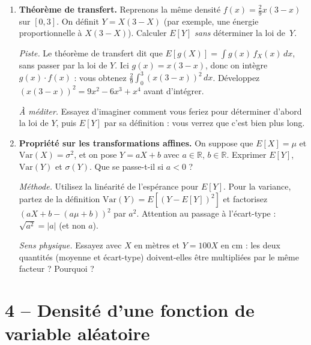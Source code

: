 \begin{enumerate}
\begin{solution}
    \textit{Comparaison.} Calculez la variance de la loi constante
    sur $[0,3]$ à l'aide de la formule de la question précédente,
    puis comparez les deux : laquelle des deux densités vous paraît
    la plus \og étalée \fg{} (revoir l'allure de $f$) ? Le résultat
    est-il cohérent ?
  \end{solution}

  \item \textbf{Théorème de transfert.}
  Reprenons la même densité $f(x)=\tfrac{2}{9}x(3-x)$ sur $[0,3]$.
  On définit $Y=X(3-X)$ (par exemple, une énergie proportionnelle
  à $X(3-X)$).
  Calculer $E[Y]$ \emph{sans} déterminer la loi de~$Y$.
  \begin{solution}
    \textit{Piste.} Le théorème de transfert dit que
    $E[g(X)]=\int g(x)\,f_X(x)\,dx$, sans passer par la loi de $Y$.
    Ici $g(x)=x(3-x)$, donc on intègre $g(x)\cdot f(x)$ :
    vous obtenez $\tfrac{2}{9}\int_0^3 (x(3-x))^2\,dx$.
    Développez $(x(3-x))^2=9x^2-6x^3+x^4$ avant d'intégrer.

    \textit{À méditer.} Essayez d'imaginer comment vous feriez
    pour déterminer d'abord la loi de $Y$, puis $E[Y]$ par
    sa définition : vous verrez que c'est bien plus long.
  \end{solution}

  \item \textbf{Propriété sur les transformations affines.}
  On suppose que $E[X]=\mu$ et $\text{Var}(X)=\sigma^2$,
  et on pose $Y=aX+b$ avec $a\in\mathbb R$, $b\in\mathbb R$.
  Exprimer $E[Y]$, $\text{Var}(Y)$ et $\sigma(Y)$.
  Que se passe-t-il si $a<0$ ?
  \begin{solution}
    \textit{Méthode.} Utilisez la linéarité de l'espérance pour
    $E[Y]$. Pour la variance, partez de la définition
    $\text{Var}(Y)=E[(Y-E[Y])^2]$ et factorisez $(aX+b-(a\mu+b))^2$
    par $a^2$. Attention au passage à l'écart-type :
    $\sqrt{a^2}=|a|$ (et non $a$).

    \textit{Sens physique.} Essayez avec $X$ en mètres et $Y=100X$
    en cm : les deux quantités (moyenne et écart-type) doivent-elles
    être multipliées par le même facteur ? Pourquoi ?
  \end{solution}
\end{enumerate}
\newpage

\section*{4 -- Densité d'une fonction de variable aléatoire}

